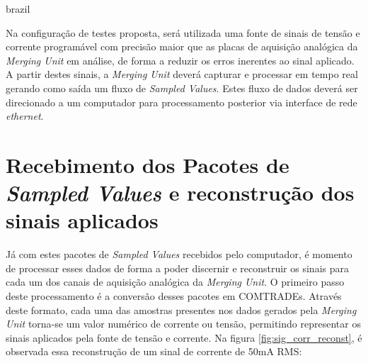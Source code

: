 \begin{otherlanguage*}{brazil}

Na configuração de testes proposta, será utilizada uma fonte de sinais de tensão e corrente programável com precisão maior que as placas de aquisição analógica da \textit{Merging Unit} em análise, de forma a reduzir os erros inerentes ao  sinal aplicado. A partir destes sinais, a \textit{Merging Unit} deverá capturar e processar em tempo real gerando como saída um fluxo de \textit{Sampled Values}. Estes fluxo de dados deverá ser direcionado a um computador para processamento posterior via interface de rede \textit{ethernet}.

\section{Recebimento dos Pacotes de \textit{Sampled Values} e reconstrução dos sinais aplicados}

Já com estes pacotes de \textit{Sampled Values} recebidos pelo computador, é momento de processar esses dados de forma a poder discernir e reconstruir os sinais para cada um dos canais de aquisição analógica da \textit{Merging Unit}. O primeiro passo deste processamento é a conversão desses pacotes em COMTRADEs. Através deste formato, cada uma das amostras presentes nos dados gerados pela \textit{Merging Unit} torna-se um valor numérico de corrente ou tensão, permitindo representar os sinais aplicados pela fonte de tensão e corrente. Na figura \ref{fig:sig_corr_reconst}, é observada essa reconstrução de um sinal de corrente de 50mA RMS:


\end{otherlanguage*}
